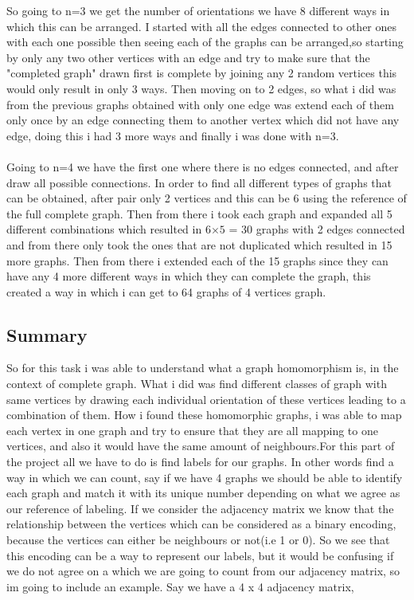 \documentclass{Assignment}
\begin{document}
	So going to n=3 we get the number of orientations we have 8 different ways in which this can be arranged.
	 I started with all the edges connected to other ones with each one possible then seeing each of the graphs can be arranged,so starting by only any two other vertices with an edge and try to make sure that the "completed graph" drawn first is complete by joining any 2 random vertices this would only result in only 3 ways.
	 Then moving on to 2 edges, so what i did was from the previous graphs obtained with only one edge was extend each of them only once by an edge connecting them to another vertex which did not have any edge, doing this i had 3 more ways and finally i was done with n=3.\\\\
	Going to n=4 we have the first one where there is no edges connected, and after draw all possible connections.
	 In order to find all different types of graphs that can be obtained, after pair only 2 vertices and this can be 6 using the reference of the full complete graph. 
	 Then from there i took each graph and expanded all 5 different combinations which resulted in 6$\times 5$ = 30 graphs with 2 edges connected and from there only took the ones that are not duplicated which resulted in 15 more graphs.
	  Then from there i extended each of the 15 graphs since they can have any 4 more different ways in which they can complete the graph, this created a way in which i can get to 64 graphs of 4 vertices graph.

\subsection*{Summary}
So for this task i was able to understand what a graph homomorphism is, in the context of complete graph.
 What i did was find different classes of graph with same vertices by drawing each individual orientation of these vertices leading to a combination of them. 
 How i found these homomorphic graphs, i was able to map each vertex in one graph and try to ensure that they are all mapping to one vertices, and also it would have the same amount of neighbours.\newpage For this part of the project all we have to do is find labels for our graphs. 
 In other words find a way in which we can count, say if we have 4 graphs we should be able to identify each graph and match it with its unique number depending on what we agree as our reference of labeling. 
 If we consider the adjacency matrix we know that the relationship between the vertices which can be considered as a binary encoding, because the vertices can either be neighbours or not(i.e 1 or 0).
So we see that this encoding can be a way to represent our labels, but it would be confusing if we do not agree on a which we are going to count from our adjacency matrix, so im going to include an example. 
Say we have a 4 x 4 adjacency matrix,
\end{document}
